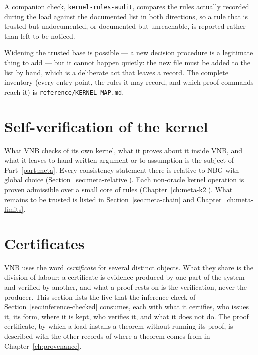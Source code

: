 A companion check, \texttt{kernel-rules-audit}, compares the rules
actually recorded during the load against the documented list in both
directions, so a rule that is trusted but undocumented, or documented but
unreachable, is reported rather than left to be noticed.

Widening the trusted base is possible --- a new decision procedure is a
legitimate thing to add --- but it cannot happen quietly: the new file
must be added to the list by hand, which is a deliberate act that leaves
a record.  The complete inventory (every entry point, the rules it may
record, and which proof commands reach it) is
\texttt{reference/KERNEL-MAP.md}.

\section{Self-verification of the kernel}

What VNB checks of its own kernel, what it proves about it inside VNB,
and what it leaves to hand-written argument or to assumption is the
subject of Part~\ref{part:meta}.  Every consistency statement there is
relative to NBG with global choice (Section~\ref{sec:meta-relative}).
Each non-oracle kernel operation is proven admissible over a small core
of rules (Chapter~\ref{ch:meta-k2}).  What remains to be trusted is
listed in Section~\ref{sec:meta-chain} and
Chapter~\ref{ch:meta-limits}.

\section{Certificates}\label{sec:certificates}

VNB uses the word \emph{certificate} for several distinct objects.  What
they share is the division of labour: a certificate is evidence produced
by one part of the system and verified by another, and what a proof rests
on is the verification, never the producer.  This section lists
the five that the inference check of Section~\ref{sec:inference-checked}
consumes, each with what it certifies, who issues it, its form, where it
is kept, who verifies it, and what it does not do.  The proof
certificate, by which a load installs a theorem without running its
proof, is described with the other records of where a theorem comes from
in Chapter~\ref{ch:provenance}.

